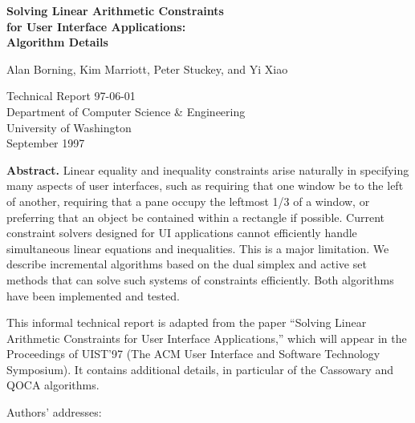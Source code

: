 \documentclass{article}
\begin{document}
\vspace*{27 mm}

\begin{center}
{\Large\bf Solving Linear Arithmetic Constraints \\
       for User Interface Applications: \\
\vspace*{1mm}
       Algorithm Details} \\ 
\vspace*{5 mm}

Alan Borning, Kim Marriott, Peter Stuckey, and Yi Xiao  \\

\vspace*{5 mm}

Technical Report 97-06-01 \\
Department of Computer Science \& Engineering \\
University of Washington \\
September 1997  \\
\end{center}

\vspace*{7 mm}

{\large {\bf Abstract.}} 
Linear equality and inequality constraints arise naturally in specifying
many aspects of user interfaces, such as requiring that one window be to
the left of another, requiring that a pane occupy the leftmost 1/3 of a
window, or preferring that an object be contained within a rectangle if
possible.  Current constraint solvers designed for UI applications cannot
efficiently handle simultaneous linear equations and inequalities.  This is
a major limitation.  We describe incremental algorithms based on the dual
simplex and active set methods that can solve such systems of constraints
efficiently.  Both algorithms have been implemented and tested.

This informal technical report is adapted from the paper ``Solving Linear
Arithmetic Constraints for User Interface Applications,'' which will appear
in the Proceedings of UIST'97 (The ACM User Interface and Software
Technology Symposium).  It contains additional details, in particular of
the Cassowary and QOCA algorithms.


\vspace*{2 mm}

Authors' addresses:
\end{document}

